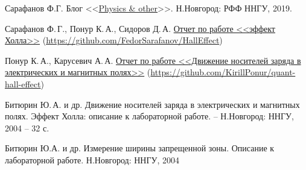 \documentclass[a4paper,14pt]{extarticle}
\begin{document}
\begin{thebibliography}{}
	 Сарафанов Ф.Г. Блог <<\href{http://fedorsarafanov.github.io}{Physics \& other}>>. Н.Новгород: РФФ ННГУ, 2019.

	 Сарафанов Ф.\,Г., Понур К.\,А., Сидоров Д.\,А. \href{https://github.com/FedorSarafanov/HallEffect}{Отчет по работе <<эффект Холла>>} (\href{https://github.com/FedorSarafanov/HallEffect}{https://github.com/FedorSarafanov/HallEffect})

	 Понур К.\,А., Карусевич А.\,А. \href{https://github.com/FedorSarafanov/HallEffect}{Отчет по работе <<Движение носителей заряда в электрических и магнитных полях>>} (\href{https://github.com/KirillPonur/quant-hall-effect}{https://github.com/KirillPonur/quant-hall-effect})

	 Битюрин Ю.\,А. и др. Движение носителей заряда в электрических и магнитных полях. Эффект Холла: описание к лабораторной работе. -- Н.Новгород: ННГУ, 2004 -- 32 с.

	 Битюрин Ю.А. и др. Измерение ширины запрещенной зоны. Описание к лабораторной работе. Н.Новгород: ННГУ, 2004
\end{thebibliography}
\end{document}
